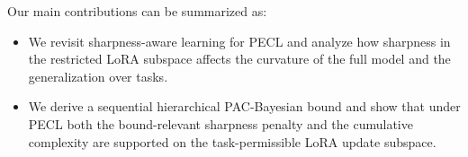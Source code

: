 \documentclass{article}
\theoremstyle{plain}
\theoremstyle{definition}
\theoremstyle{remark}
\begin{document}
Our main contributions can be summarized as:
\begin{itemize}
\vspace{-8pt}
\item
We revisit sharpness-aware learning for PECL and analyze how sharpness in the restricted LoRA subspace affects the curvature of the full model and the generalization over tasks.
\vspace{-2pt}
\item
We derive a sequential hierarchical PAC-Bayesian bound and show that under PECL both the bound-relevant sharpness penalty and the cumulative complexity are supported on the task-permissible LoRA update subspace.

\end{itemize}
\end{document}
